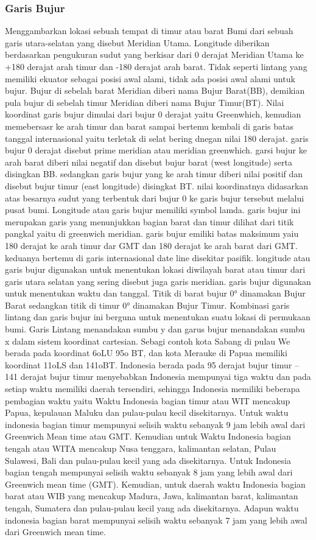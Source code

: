 \subsubsection{Garis Bujur}
Menggambarkan lokasi sebuah tempat di timur atau barat Bumi dari sebuah garis utara-selatan yang disebut Meridian Utama. Longitude diberikan berdasarkan pengukuran sudut yang berkisar dari 0 derajat Meridian Utama ke +180 derajat arah timur dan -180 derajat arah barat. Tidak seperti lintang yang memiliki ekuator sebagai posisi awal alami, tidak ada posisi awal alami untuk bujur. Bujur di sebelah barat Meridian diberi nama Bujur Barat(BB), demikian pula bujur di sebelah timur Meridian diberi nama Bujur Timur(BT).
Nilai koordinat garis bujur dimulai dari bujur 0 derajat yaitu Greenwhich, kemudian memebersasr ke arah timur dan barat sampai bertemu kembali di garis batas tanggal internasional yaitu terletak di selat bering dnegan nilai 180 derajat. garis bujur 0 derajat disebut prime meridian atau meridian greenwhich. garsi bujur ke arah barat diberi nilai negatif dan disebut bujur barat (west longitude) serta disingkan BB. sedangkan garis bujur yang ke arah timur diberi nilai positif dan disebut bujur timur (east longitude) disingkat BT. nilai koordinatnya didasarkan atas besarnya sudut yang terbentuk dari bujur 0 ke garis bujur tersebut melalui pusat bumi.
Longitude atau garis bujur memiliki symbol lamda. garis bujur ini merupakan garis yang menunjukkan bagian barat dan timur dilihat dari titik pangkal yaitu di greenwich meridian. garis bujur emiliki batas maksimum yaiu 180 derajat ke arah timur dar GMT dan 180 derajat ke arah barat dari GMT. keduanya bertemu di garis internasional date line disekitar pasifik.
longitude atau garis bujur digunakan untuk menentukan lokasi diwilayah barat atau timur dari garis utara selatan yang sering disebut juga garis meridian. garis bujur digunakan untuk menentukan waktu dan tanggal.
Titik di barat bujur 0° dinamakan Bujur Barat sedangkan titik di timur 0° dinamakan Bujur Timur. Kombinasi garis lintang dan garis bujur ini berguna untuk menentukan suatu lokasi di permukaan bumi. Garis Lintang menandakan sumbu y dan garus bujur menandakan sumbu x dalam sistem koordinat cartesian. Sebagi contoh kota Sabang di pulau We berada pada koordinat 6oLU 95o BT, dan kota Merauke di Papua memiliki koordinat 11oLS dan 141oBT.
Indonesia berada pada 95 derajat bujur timur – 141 derajat bujur timur menyebabkan Indonesia mempunyai tiga waktu dan pada setiap waktu memiliki daerah tersendiri, sehingga Indonesia memiliki beberapa pembagian waktu yaitu Waktu Indonesia bagian timur atau WIT mencakup Papua, kepulauan Maluku dan pulau-pulau kecil disekitarnya. Untuk waktu indonesia bagian  timur mempunyai selisih waktu sebanyak 9 jam lebih awal dari Greenwich Mean time atau GMT. Kemudian untuk Waktu Indonesia bagian tengah atau WITA mencakup Nusa tenggara, kalimantan selatan, Pulau Sulawesi, Bali dan pulau-pulau kecil yang ada disekitarnya. Untuk Indonesia bagian tengah mempunyai selisih waktu sebanyak 8 jam yang lebih awal dari Greenwich mean time (GMT). Kemudian, untuk daerah waktu Indonesia bagian barat atau WIB yang mencakup Madura, Jawa, kalimantan barat, kalimantan tengah, Sumatera dan pulau-pulau kecil yang ada disekitarnya. Adapun waktu indonesia bagian barat mempunyai selisih waktu sebanyak 7 jam yang lebih awal dari Greenwich mean time.
